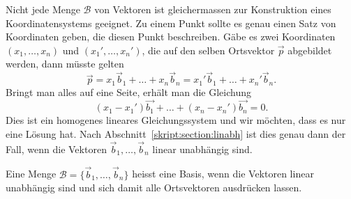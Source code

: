 Nicht jede Menge $\mathcal{B}$ von Vektoren ist gleichermassen
zur Konstruktion eines Koordinatensystems geeignet.
Zu einem Punkt sollte es genau einen Satz von Koordinaten geben,
die diesen Punkt beschreiben.
Gäbe es zwei Koordinaten $(x_1,\dots,x_n)$ und $(x_1',\dots,x_n')$,
die auf den selben Ortsvektor $\vec{p}$ abgebildet werden, dann müsste gelten
\[
\vec{p}=
x_1\vec{b}_1+\dots+x_n\vec{b}_n
=
x_1'\vec{b}_1+\dots+x_n'\vec{b}_n.
\]
Bringt man alles auf eine Seite, erhält man die Gleichung
\[
(x_1-x_1')\vec{b_1}
+\dots+
(x_n-x_n')\vec{b_n}
=0.
\]
Dies ist ein homogenes lineares Gleichungssystem und wir möchten, dass
es nur eine Lösung hat.
Nach Abschnitt~\ref{skript:section:linabh} ist dies genau dann der Fall,
wenn die Vektoren $\vec{b}_1,\dots,\vec{b}_n$ linear unabhängig sind.

\begin{definition}
Eine Menge $\mathcal{B}=\{\vec{b}_1,\dots,\vec{b}_n\}$ heisst eine Basis,
wenn die Vektoren linear unabhängig sind und sich damit alle Ortsvektoren
ausdrücken lassen.
\end{definition}

